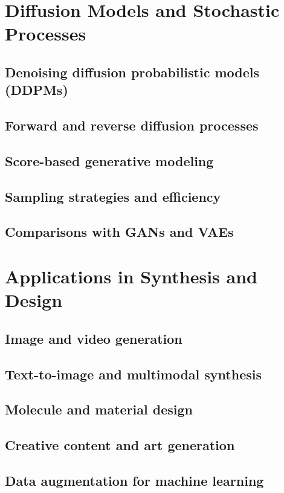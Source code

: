 \section{Diffusion Models and Stochastic Processes}
\subsection{Denoising diffusion probabilistic models (DDPMs)}
\subsection{Forward and reverse diffusion processes}
\subsection{Score-based generative modeling}
\subsection{Sampling strategies and efficiency}
\subsection{Comparisons with GANs and VAEs}

\section{Applications in Synthesis and Design}
\subsection{Image and video generation}
\subsection{Text-to-image and multimodal synthesis}
\subsection{Molecule and material design}
\subsection{Creative content and art generation}
\subsection{Data augmentation for machine learning}


